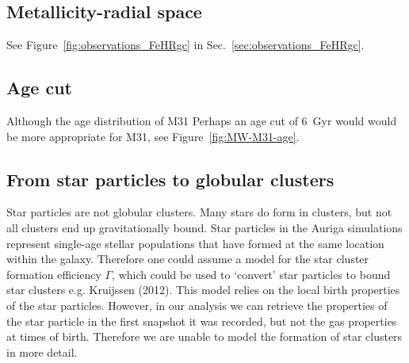 \documentclass[a4paper,fleqn,usenatbib]{mnras}
\begin{document}
\subsection{Metallicity-radial space}
\label{sec:discussion_FeHRgc}
See Figure~\ref{fig:observations_FeHRgc} in Sec.~\ref{sec:observations_FeHRgc}.



\subsection{Age cut}
Although the age distribution of M31 Perhaps an age cut of 6~Gyr would would be more
appropriate for M31, see Figure~\ref{fig:MW-M31-age}.



\subsection{From star particles to globular clusters}
\label{sec:discussion_mass_excess}
Star particles are not globular clusters. Many stars do form in clusters, but
not all clusters end up gravitationally bound. Star particles in the
Auriga simulations represent single-age stellar populations that have formed
at the same location within the galaxy. Therefore one could assume a model
for the star cluster formation efficiency $\Gamma$, which could be used to
`convert' star particles to bound star clusters e.g. Kruijssen (2012). This
model relies on the local birth properties of the star particles. However,
in our analysis we can retrieve the properties of the star particle in the
first snapshot it was recorded, but not the gas properties at times of birth.
Therefore we are unable to model the formation of star clusters in more detail.
\end{document}
